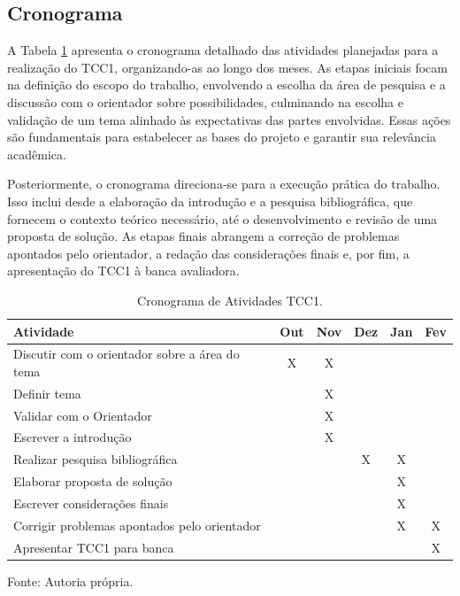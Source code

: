 \subsection{Cronograma}
\label{sec:cronograma}

A Tabela \ref{tab:cronograma_tcc1} apresenta o cronograma detalhado das atividades planejadas para a realização do TCC1, organizando-as ao longo dos meses. As etapas iniciais focam na definição do escopo do trabalho, envolvendo a escolha da área de pesquisa e a discussão com o orientador sobre possibilidades, culminando na escolha e validação de um tema alinhado às expectativas das partes envolvidas. Essas ações são fundamentais para estabelecer as bases do projeto e garantir sua relevância acadêmica.

Posteriormente, o cronograma direciona-se para a execução prática do trabalho. Isso inclui desde a elaboração da introdução e a pesquisa bibliográfica, que fornecem o contexto teórico necessário, até o desenvolvimento e revisão de uma proposta de solução. As etapas finais abrangem a correção de problemas apontados pelo orientador, a redação das considerações finais e, por fim, a apresentação do TCC1 à banca avaliadora.

\begin{table}[h!]
    \centering
    \begin{tabular}{|m{6cm}|c|c|c|c|c|}
        \hline
        \textbf{Atividade} & \textbf{Out} & \textbf{Nov} & \textbf{Dez} & \textbf{Jan} & \textbf{Fev} \\ \hline
        Discutir com o orientador sobre a área do tema & X & X & & & \\ \hline
        Definir tema & & X & & & \\ \hline
        Validar com o Orientador & & X & & & \\ \hline
        Escrever a introdução & & X &  & & \\ \hline
        Realizar pesquisa bibliográfica & & & X & X &  \\ \hline
        Elaborar proposta de solução & & & & X & \\ \hline
        Escrever considerações finais & & & & X &  \\ \hline
        Corrigir problemas apontados pelo orientador & & & & X & X \\ \hline
        Apresentar TCC1 para banca & & & & & X \\ \hline
    \end{tabular}
    \caption{Cronograma de Atividades TCC1.}
    \label{tab:cronograma_tcc1}
    Fonte: Autoria própria.
\end{table}

